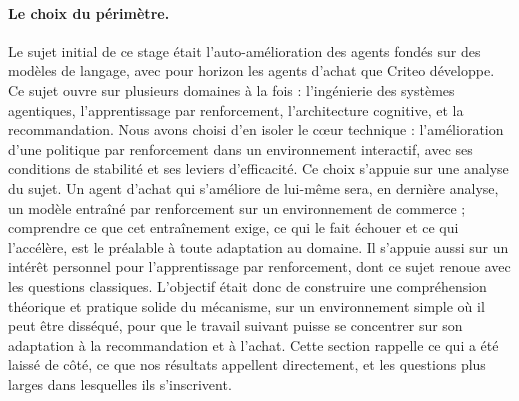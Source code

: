 \documentclass[11pt,a4paper]{article}
\begin{document}
\paragraph{Le choix du périmètre.} Le sujet initial de ce stage était l'auto-amélioration des agents fondés sur des modèles de langage, avec pour horizon les agents d'achat que Criteo développe. Ce sujet ouvre sur plusieurs domaines à la fois : l'ingénierie des systèmes agentiques, l'apprentissage par renforcement, l'architecture cognitive, et la recommandation. Nous avons choisi d'en isoler le cœur technique : l'amélioration d'une politique par renforcement dans un environnement interactif, avec ses conditions de stabilité et ses leviers d'efficacité. Ce choix s'appuie sur une analyse du sujet. Un agent d'achat qui s'améliore de lui-même sera, en dernière analyse, un modèle entraîné par renforcement sur un environnement de commerce ; comprendre ce que cet entraînement exige, ce qui le fait échouer et ce qui l'accélère, est le préalable à toute adaptation au domaine. Il s'appuie aussi sur un intérêt personnel pour l'apprentissage par renforcement, dont ce sujet renoue avec les questions classiques. L'objectif était donc de construire une compréhension théorique et pratique solide du mécanisme, sur un environnement simple où il peut être disséqué, pour que le travail suivant puisse se concentrer sur son adaptation à la recommandation et à l'achat. Cette section rappelle ce qui a été laissé de côté, ce que nos résultats appellent directement, et les questions plus larges dans lesquelles ils s'inscrivent.
\end{document}
